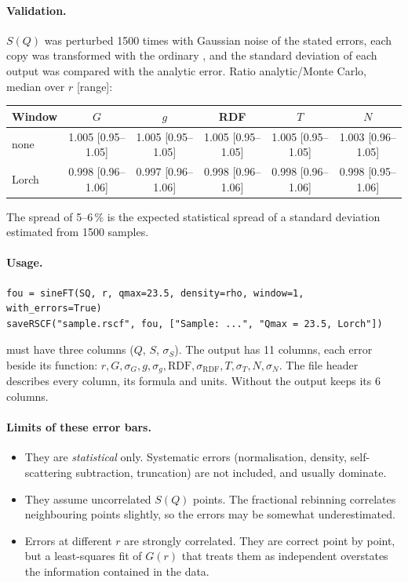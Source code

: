 \documentclass[11pt,a4paper]{article}
\begin{document}
\paragraph{Validation.} $S(Q)$ was perturbed 1500 times with Gaussian noise
of the stated errors, each copy was transformed with the ordinary
, and the standard deviation of each output was compared with
the analytic error. Ratio analytic/Monte Carlo, median over $r$ [range]:

\begin{center}\small\setlength{\tabcolsep}{4pt}
\begin{tabular}{@{}l c c c c c@{}}
\toprule
Window & $G$ & $g$ & RDF & $T$ & $N$ \\
\midrule
none    & 1.005 [0.95--1.05] & 1.005 [0.95--1.05] & 1.005 [0.95--1.05] & 1.005 [0.95--1.05] & 1.003 [0.96--1.05] \\
Lorch   & 0.998 [0.96--1.06] & 0.997 [0.96--1.06] & 0.998 [0.96--1.06] & 0.998 [0.96--1.06] & 0.998 [0.95--1.06] \\
\bottomrule
\end{tabular}
\end{center}
The spread of 5--6\,\% is the expected statistical spread of a standard
deviation estimated from 1500 samples.

\paragraph{Usage.}
\begin{lstlisting}
fou = sineFT(SQ, r, qmax=23.5, density=rho, window=1, with_errors=True)
saveRSCF("sample.rscf", fou, ["Sample: ...", "Qmax = 23.5, Lorch"])
\end{lstlisting}
 must have three columns ($Q$, $S$, $\sigma_S$). The output has 11
columns, each error beside its function:
$r, G, \sigma_G, g, \sigma_g, \mathrm{RDF}, \sigma_\mathrm{RDF}, T, \sigma_T, N, \sigma_N$.
The file header describes every column, its formula and units. Without
 the output keeps its 6 columns.

\paragraph{Limits of these error bars.}
\begin{itemize}
  \item They are \emph{statistical} only. Systematic errors (normalisation,
    density, self-scattering subtraction, truncation) are not included, and
    usually dominate.
  \item They assume uncorrelated $S(Q)$ points. The fractional rebinning
    correlates neighbouring points slightly, so the errors may be somewhat
    underestimated.
  \item Errors at different $r$ are strongly correlated. They are correct
    point by point, but a least-squares fit of $G(r)$ that treats them as
    independent overstates the information contained in the data.
\end{itemize}
\end{document}
